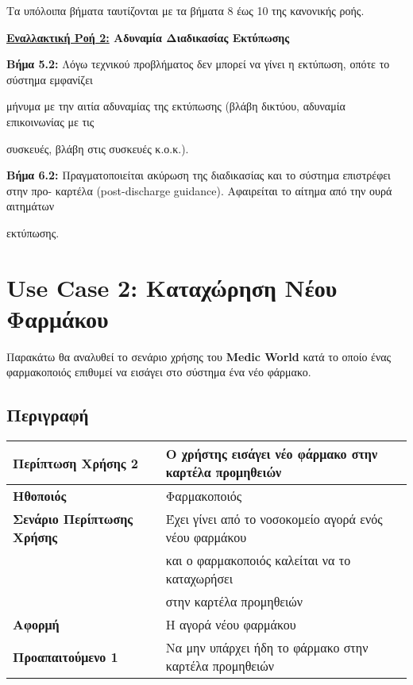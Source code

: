 \documentclass{article}
\newcommand\T{\rule{0pt}{2.6ex}}       %
\newcommand\B{\rule[-1.2ex]{0pt}{0pt}}
\begin{document}
\par Τα υπόλοιπα βήματα ταυτίζονται με τα βήματα 8 έως 10 της κανονικής ροής.

\vspace{0.2cm}

 \textbf{\underline{Εναλλακτική Ροή 2:} Αδυναμία Διαδικασίας Εκτύπωσης} \vspace{0.2cm}
\par \textbf{Βήμα 5.2:} Λόγω τεχνικού προβλήματος δεν μπορεί να γίνει η εκτύπωση, οπότε το σύστημα εμφανίζει \par μήνυμα με την αιτία αδυναμίας της εκτύπωσης (βλάβη δικτύου, αδυναμία επικοινωνίας με τις \par συσκευές, βλάβη στις συσκευές κ.ο.κ.). \vspace{0.1cm}
\par \textbf{Βήμα 6.2:} Πραγματοποιείται ακύρωση της διαδικασίας και το σύστημα επιστρέφει στην προ-  καρτέλα (post-discharge guidance). Αφαιρείται το αίτημα από την ουρά αιτημάτων \par εκτύπωσης.

\section{Use Case 2: Καταχώρηση Νέου Φαρμάκου }
 
 Παρακάτω θα αναλυθεί το σενάριο χρήσης του \textbf{Medic World} κατά το οποίο ένας φαρμακοποιός επιθυμεί να εισάγει στο σύστημα ένα νέο φάρμακο.
 
\subsection{Περιγραφή}

\begin{center}
     \begin{tabular}{|l|l|}
     \hline
      \textbf{Περίπτωση Χρήσης 2} & Ο χρήστης εισάγει νέο φάρμακο στην καρτέλα προμηθειών \T\B \\ 
      \hline
      \textbf{Ηθοποιός} & Φαρμακοποιός \T\B \\
      \hline
      \textbf{Σενάριο Περίπτωσης Χρήσης} & Έχει γίνει από το νοσοκομείο αγορά ενός νέου φαρμάκου \T \\& και ο φαρμακοποιός καλείται να το καταχωρήσει \\& στην καρτέλα προμηθειών \B \\
      \hline
      \textbf{Αφορμή} & Η αγορά νέου φαρμάκου \T\B \\
      \hline
      \textbf{Προαπαιτούμενο 1} &  Να μην υπάρχει ήδη το φάρμακο στην καρτέλα προμηθειών \T\B \\
      \hline
     \end{tabular}
 \end{center}
 
\end{document}

